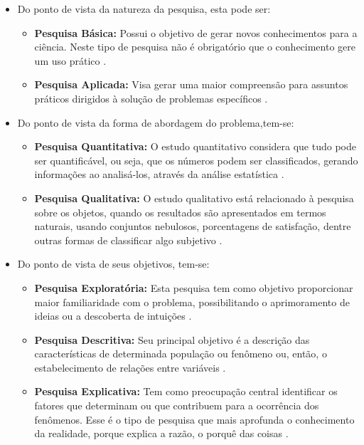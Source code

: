 \begin{itemize}
	\item Do ponto de vista da natureza da pesquisa, esta pode ser:
		\begin{itemize}
			\item \textbf{Pesquisa Básica:} Possui o objetivo de gerar novos conhecimentos para a ciência. Neste tipo de pesquisa não é obrigatório que o conhecimento gere um uso prático \cite{Silva:Tafner:2007}.
			\item \textbf{Pesquisa Aplicada:} Visa gerar uma maior compreensão para assuntos práticos dirigidos à solução de problemas específicos \cite{Silva:Tafner:2007}.
		\end{itemize}

	\item Do ponto de vista da forma de abordagem do problema,tem-se:
		\begin{itemize}
			\item \textbf{Pesquisa Quantitativa:} O estudo quantitativo considera que tudo pode ser quantificável, ou seja, que os números podem ser classificados, gerando informações ao analisá-los, através da análise estatística \cite{Travassos:2002}.
			\item \textbf{Pesquisa Qualitativa:} O estudo qualitativo está relacionado à pesquisa sobre os objetos, quando os resultados são apresentados em termos naturais, usando conjuntos nebulosos, porcentagens de satisfação, dentre outras formas de classificar algo subjetivo \cite{Travassos:2002}.
		\end{itemize}

	\item Do ponto de vista de seus objetivos, tem-se:
		\begin{itemize}
			\item \textbf{Pesquisa Exploratória:} Esta pesquisa tem como objetivo proporcionar maior familiaridade com o problema, possibilitando o aprimoramento de ideias ou a descoberta de intuições \cite{Gil:2010}.
			\item \textbf{Pesquisa Descritiva:} Seu principal objetivo é a descrição das características de determinada população ou fenômeno ou, então, o estabelecimento de relações entre variáveis \cite{Gil:2010}.
			\item \textbf{Pesquisa Explicativa:} Tem como preocupação central identificar os fatores que determinam ou que contribuem para a ocorrência dos fenômenos. Esse é o tipo de pesquisa que mais aprofunda o conhecimento da realidade, porque explica a razão, o porquê das coisas \cite{Gil:2010}.
		\end{itemize}


\end{itemize}
